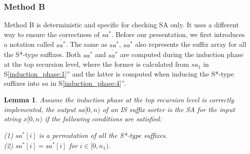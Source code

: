 \documentclass[10pt,journal,compsoc]{IEEEtran}
\newtheorem{lemma}[theorem]{Lemma}
\begin{document}

\begin{algorithm*}

	\caption{The Algorithm Based on Lemma~\ref{lemma:3}.}
	
	\label{alg:2}
	
	\end{algorithm*}


\subsubsection{Method B}\label{sec:proposals:method_b}

Method B is deterministic and specific for checking SA only. It uses a different way to ensure the correctness of $sa^*$. Before our presentation, we first introduces a notation called $\overline{sa^*}$. The same as $sa^*$, $\overline{sa^*}$ also represents the suffix array for all the S*-type suffixes. Both $sa^*$ and $\overline{sa^*}$ are computed during the induction phase at the top recursion level, where the former is calculated from $sa_1$ in S\ref{induction_phase:1}'' and the latter is computed when inducing the S*-type suffixes into $sa$ in S\ref{induction_phase:4}''. 

\begin{lemma} \label{lemma:4}
    Assume the induction phase at the top recursion level is correctly implemented, the output $sa[0, n)$ of an IS suffix sorter is the SA for the input string $x[0, n)$ if the following conditions are satisfied:

	(1) $sa^*[i]$ is a permutation of all the S*-type suffixes. \\
	(2) $sa^*[i] = \overline{sa^*}[i]$ for $i \in [0, n_1)$. \\
\end{lemma}
\end{document}
